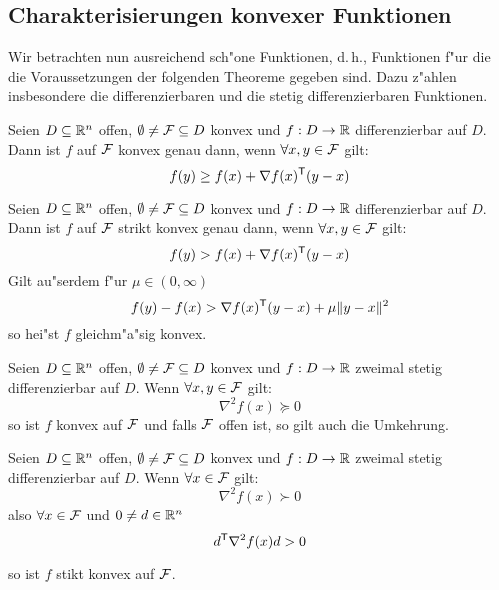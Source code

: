 \subsection{Charakterisierungen konvexer Funktionen}
Wir betrachten nun ausreichend sch"one Funktionen, d.\,h., Funktionen f"ur die die Voraussetzungen der folgenden Theoreme gegeben sind.
Dazu z"ahlen insbesondere die differenzierbaren und die stetig differenzierbaren Funktionen.
\begin{Satz}
\label{chr1O1}
	Seien $D\subseteq\mathbb R^n$ offen, $\emptyset\neq\mathcal{F}\subseteq D$ konvex und $f:D\to\mathbb R$ differenzierbar auf $D$.
	Dann ist $f$ auf $\mathcal{F}$ konvex genau dann, wenn $\forall x, y \in \mathcal{F}$ gilt:
	\begin{equation}
		f(y) \geq f(x) + \nabla f(x)^\mathsf{T}(y - x)
	\end{equation}
\end{Satz}
%
\begin{Satz}
\label{chr1O2}
	Seien $D\subseteq\mathbb R^n$ offen, $\emptyset\neq\mathcal{F}\subseteq D$ konvex und $f:D\to\mathbb R$ differenzierbar auf $D$.
	Dann ist $f$ auf $\mathcal{F}$ strikt konvex genau dann, wenn $\forall x, y \in \mathcal{F}$ gilt:
	\begin{equation}
		f(y) > f(x) + \nabla f(x)^\mathsf{T}(y - x)
	\end{equation}
	\noindent
	Gilt au"serdem f"ur $\mu \in (0, \infty)$
	\begin{equation}
		f(y) - f(x) > \nabla f(x)^\mathsf{T}(y - x) + \mu\Vert y - x \Vert^2
	\end{equation}
	\noindent
	so hei"st $f$ gleichm"a"sig konvex.
\end{Satz}
%
\begin{Satz}
\label{thm:chr2O1}
	Seien $D\subseteq\mathbb R^n$ offen, $\emptyset\neq\mathcal{F}\subseteq D$ konvex und $f:D\to\mathbb R$ zweimal stetig differenzierbar auf $D$.
	Wenn $\forall x, y \in \mathcal{F}$ gilt:
	\begin{equation}
		\nabla^2 f(x) \succcurlyeq 0
	\end{equation}
	\noindent
	so ist $f$ konvex auf $\mathcal{F}$ und falls $\mathcal{F}$ offen ist, so gilt auch die Umkehrung.
\end{Satz}
%
\begin{Satz}
\label{thm:chr2O2}
	Seien $D\subseteq\mathbb R^n$ offen, $\emptyset\neq\mathcal{F}\subseteq D$ konvex und $f:D\to\mathbb R$ zweimal stetig differenzierbar auf $D$.
	Wenn $\forall x\in \mathcal{F}$ gilt:
	\begin{equation}
		\nabla^2 f(x) \succ 0
	\end{equation}
	\noindent
	also $\forall x \in \mathcal{F}$ und $0\neq d\in\mathbb R^n$
	\begin{equation}
		d^\mathsf{T}\nabla^2 f(x)d > 0
	\end{equation}

	\noindent
	so ist $f$ stikt konvex auf $\mathcal{F}$.
\end{Satz}
